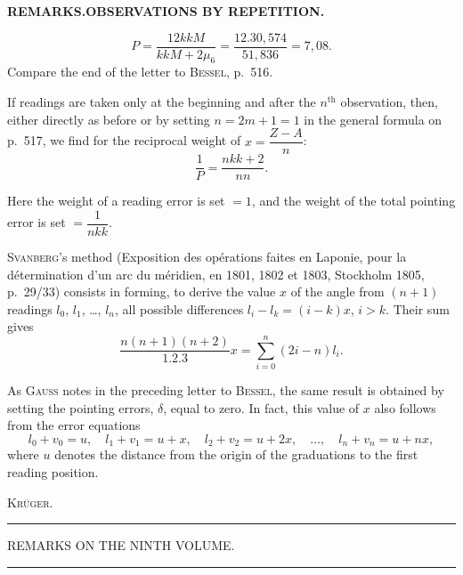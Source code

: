 \par\clearpage
\noindent{}\hfill{\small\textbf{REMARKS.\quad OBSERVATIONS BY REPETITION.}}\hfill\null\par\medskip
\[
 P=\frac{12kkM}{kkM+2\mu_6}=\frac{12.30{,}574}{51{,}836}=7{,}08.
\]
\indent Compare the end of the letter to \textsc{Bessel}, p.~516.

If readings are taken only at the beginning and after the $n^{\text{th}}$ observation, then, either directly as before or by setting $n=2m+1=1$ in the general formula on p.~517, we find for the reciprocal weight of $x=\dfrac{Z-A}{n}$:
\[
 \frac{1}{P}=\frac{nkk+2}{nn}.
\]

Here the weight of a reading error is set $=1$, and the weight of the total pointing error is set $=\dfrac{1}{nkk}$.

\textsc{Svanberg}'s method (Exposition des opérations faites en Laponie, pour la détermination d'un arc du méridien, en 1801, 1802 et 1803, Stockholm 1805, p.~29/33) consists in forming, to derive the value $x$ of the angle from $(n+1)$ readings $l_0$, $l_1$, \ldots, $l_n$, all possible differences $l_i-l_k=(i-k)x$, $i>k$. Their sum gives
\[
 \frac{n(n+1)(n+2)}{1.2.3}x=\sum_{i=0}^{n}(2i-n)l_i.
\]

As \textsc{Gauss} notes in the preceding letter to \textsc{Bessel}, the same result is obtained by setting the pointing errors, $\delta$, equal to zero. In fact, this value of $x$ also follows from the error equations
\[
 l_0+v_0=u,\quad l_1+v_1=u+x,\quad l_2+v_2=u+2x,\quad \ldots,\quad l_n+v_n=u+nx,
\]
where $u$ denotes the distance from the origin of the graduations to the first reading position.\par
\hfill\textsc{Krüger.}\hspace*{\parindent}\par

\vspace{2.5cm}
\begin{center}\rule{4cm}{.4pt}\end{center}

\par\clearpage
\vspace*{.11\textheight}
\begin{center}
 {\Large REMARKS ON THE NINTH VOLUME.}\par
 \vspace{1em}
 \rule{1.5cm}{.4pt}
\end{center}
\vspace{1em}

